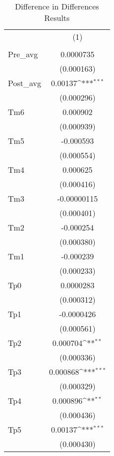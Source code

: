 \begin{table}[htbp]\centering
\def\sym#1{\ifmmode^{#1}\else\(^{#1}\)\fi}
\caption{Difference in Differences Results}
\begin{tabular}{l*{1}{c}}
\hline\hline
            &\multicolumn{1}{c}{(1)}\\
            &\multicolumn{1}{c}{} \\
\hline
Pre\_avg     &   0.0000735         \\
            &  (0.000163)         \\
[1em]
Post\_avg    &     0.00137\sym{***}\\
            &  (0.000296)         \\
[1em]
Tm6         &    0.000902         \\
            &  (0.000939)         \\
[1em]
Tm5         &   -0.000593         \\
            &  (0.000554)         \\
[1em]
Tm4         &    0.000625         \\
            &  (0.000416)         \\
[1em]
Tm3         & -0.00000115         \\
            &  (0.000401)         \\
[1em]
Tm2         &   -0.000254         \\
            &  (0.000380)         \\
[1em]
Tm1         &   -0.000239         \\
            &  (0.000233)         \\
[1em]
Tp0         &   0.0000283         \\
            &  (0.000312)         \\
[1em]
Tp1         &  -0.0000426         \\
            &  (0.000561)         \\
[1em]
Tp2         &    0.000704\sym{**} \\
            &  (0.000336)         \\
[1em]
Tp3         &    0.000868\sym{***}\\
            &  (0.000329)         \\
[1em]
Tp4         &    0.000896\sym{**} \\
            &  (0.000436)         \\
[1em]
Tp5         &     0.00137\sym{***}\\
            &  (0.000430)         \\

\end{tabular}
\end{table}
